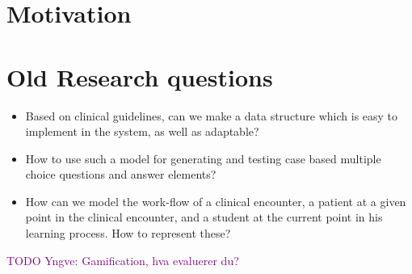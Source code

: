 
\section{Motivation}
\section{Old Research questions}
\begin{itemize}
	\item Based on clinical guidelines, can we make a data structure which is easy to implement in the system, as well as adaptable? 
	
	\item How to use such a model for generating and testing case based multiple choice questions and answer elements?
	
	
	\item How can we model the work-flow of a clinical encounter, a patient at a given point in the clinical encounter, and a student at the current point in his learning process. How to represent these?	
\end{itemize}
\textcolor{purple}{TODO Yngve: Gamification, hva evaluerer du?}
